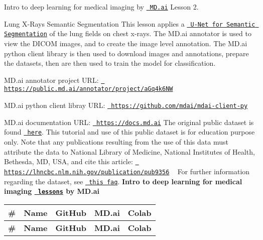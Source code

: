 Intro to deep learning for medical imaging by \href{https://www.md.ai}{\texttt{ MD.\+ai}} Lesson 2.

Lung X-\/\+Rays Semantic Segmentation This lesson applies a \href{https://arxiv.org/abs/1505.04597}{\texttt{ U-\/\+Net for Semantic Segmentation}} of the lung fields on chest x-\/rays. The MD.\+ai annotator is used to view the DICOM images, and to create the image level annotation. The MD.\+ai python client library is then used to download images and annotations, prepare the datasets, then are then used to train the model for classification.
\begin{DoxyItemize}
\item MD.\+ai annotator project URL\+: \href{https://public.md.ai/annotator/project/aGq4k6NW}{\texttt{ https\+://public.\+md.\+ai/annotator/project/a\+Gq4k6\+NW}}
\item MD.\+ai python client libray URL\+: \href{https://github.com/mdai/mdai-client-py}{\texttt{ https\+://github.\+com/mdai/mdai-\/client-\/py}}
\item MD.\+ai documentation URL\+: \href{https://docs.md.ai}{\texttt{ https\+://docs.\+md.\+ai}} The original public dataset is found \href{https://ceb.nlm.nih.gov/repositories/tuberculosis-chest-x-ray-image-data-sets/}{\texttt{ here}}. This tutorial and use of this public dataset is for education purpose only. Note that any publications resulting from the use of this data must attribute the data to National Library of Medicine, National Institutes of Health, Bethesda, MD, USA, and cite this article\+: \href{https://lhncbc.nlm.nih.gov/publication/pub9356}{\texttt{ https\+://lhncbc.\+nlm.\+nih.\+gov/publication/pub9356}} ~\newline
 For further information regarding the dataset, see \href{https://openi.nlm.nih.gov/faq.php}{\texttt{ this faq}}. {\bfseries{Intro to deep learning for medical imaging \href{https://github.com/mdai/ml-lessons}{\texttt{ lessons}} by MD.\+ai}} \tabulinesep=1mm
\begin{longtabu}spread 0pt [c]{*{5}{|X[-1]}|}
\hline
\PBS\centering \cellcolor{\tableheadbgcolor}\textbf{ \#   }&\PBS\centering \cellcolor{\tableheadbgcolor}\textbf{ Name   }&\PBS\centering \cellcolor{\tableheadbgcolor}\textbf{ Git\+Hub   }&\PBS\centering \cellcolor{\tableheadbgcolor}\textbf{ MD.\+ai   }&\PBS\centering \cellcolor{\tableheadbgcolor}\textbf{ Colab    }\\
\endfirsthead
\hline
\endfoot
\hline
\PBS\centering \cellcolor{\tableheadbgcolor}\textbf{ \#   }&\PBS\centering \cellcolor{\tableheadbgcolor}\textbf{ Name   }&\PBS\centering \cellcolor{\tableheadbgcolor}\textbf{ Git\+Hub   }&\PBS\centering \cellcolor{\tableheadbgcolor}\textbf{ MD.\+ai   }&\PBS\centering \cellcolor{\tableheadbgcolor}\textbf{ Colab    }\\

\end{longtabu}
\end{DoxyItemize}
